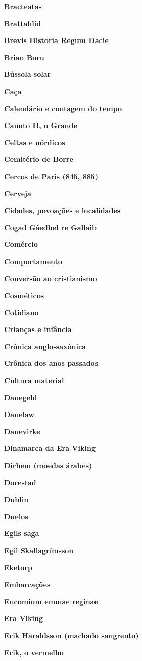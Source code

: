 \textbf{Bracteatas}

\textbf{Brattahlid}

\textbf{Brevis Historia Regum Dacie}

\textbf{Brian Boru}

\textbf{Bússola solar}

\textbf{Caça}

\textbf{Calendário e contagem do tempo}

\textbf{Canuto II, o Grande}

\textbf{Celtas e nórdicos}

\textbf{Cemitério de Borre}

\textbf{Cercos de Paris (845, 885)}

\textbf{Cerveja}

\textbf{Cidades, povoações e localidades}

\textbf{Cogad Gáedhel re Gallaib}

\textbf{Comércio}

\textbf{Comportamento}

\textbf{Conversão ao cristianismo}

\textbf{Cosméticos}

\textbf{Cotidiano}

\textbf{Crianças e infância}

\textbf{Crônica anglo-saxônica}

\textbf{Crônica dos anos passados}

\textbf{Cultura material}

\textbf{Danegeld}

\textbf{Danelaw}

\textbf{Danevirke}

\textbf{Dinamarca da Era Viking}

\textbf{Dirhem (moedas árabes)}

\textbf{Dorestad}

\textbf{Dublin}

\textbf{Duelos}

\textbf{Egils saga}

\textbf{Egil Skallagrímsson}

\textbf{Eketorp}

\textbf{Embarcações}

\textbf{Encomium emmae reginae}

\textbf{Era Viking}

\textbf{Erik Haraldsson (machado sangrento)}

\textbf{Erik, o vermelho}

